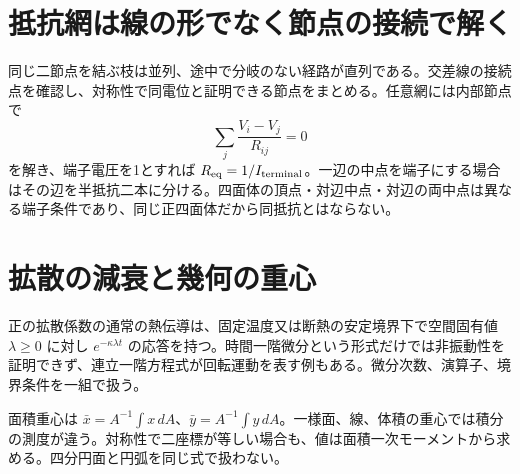 \section{抵抗網は線の形でなく節点の接続で解く}
\label{theory:analysis:network}
\label{theory:analysis:tetra}
同じ二節点を結ぶ枝は並列、途中で分岐のない経路が直列である。交差線の接続点を確認し、対称性で同電位と証明できる節点をまとめる。任意網には内部節点で
\[
 \sum_j\frac{V_i-V_j}{R_{ij}}=0
\]
を解き、端子電圧を1とすれば \(R_{\rm eq}=1/I_{\rm terminal}\)。一辺の中点を端子にする場合はその辺を半抵抗二本に分ける。四面体の頂点・対辺中点・対辺の両中点は異なる端子条件であり、同じ正四面体だから同抵抗とはならない。\cite{analysis57_resistors}

\section{拡散の減衰と幾何の重心}
\label{theory:analysis:heat}
\label{theory:analysis:centroid}
正の拡散係数の通常の熱伝導は、固定温度又は断熱の安定境界下で空間固有値 \(\lambda\ge0\) に対し \(e^{-\kappa\lambda t}\) の応答を持つ。時間一階微分という形式だけでは非振動性を証明できず、連立一階方程式が回転運動を表す例もある。微分次数、演算子、境界条件を一組で扱う。

面積重心は \(\bar x=A^{-1}\int x\,dA\)、\(\bar y=A^{-1}\int y\,dA\)。一様面、線、体積の重心では積分の測度が違う。対称性で二座標が等しい場合も、値は面積一次モーメントから求める。四分円面と円弧を同じ式で扱わない。
